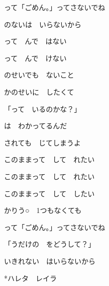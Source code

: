 \documentclass[a4paper,tate,twocolumn,12pt]{ltjtarticle}
\begin{document}
\begin{flushleft}
\begin{minipage}{\linewidth}
って「ごめん。」ってさないでね

のないは　いらないから
\end{minipage}

\vspace{2em}

\noindent\begin{minipage}{\linewidth}
って　んで　はない

って　んで　けない

のせいでも　ないこと

かのせいに　したくて

「って　いるのかな？」

は　わかってるんだ

されても　じてしまうよ
\end{minipage}

\vspace{3em}

\noindent\begin{minipage}{\linewidth}
このままって　して　れたい

このままって　して　れたい
\end{minipage}

\vspace{2em}

\noindent\begin{minipage}{\linewidth}
このままって　して　したい

かりう○　1つもなくても

って「ごめん。」ってさないでね

「うだけの　をどうして？」

いきれない　はいらないから
\end{minipage}

\vspace{2em}

\noindent\begin{minipage}{\linewidth}
*ハレタ　レイラ
\end{minipage}

\end{flushleft}
\end{document}

